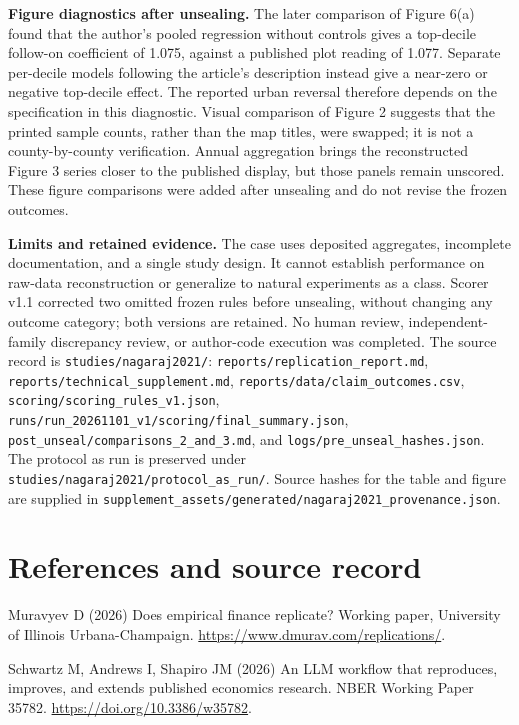 \documentclass[11pt]{article}
\newcommand{\artifact}[1]{\nolinkurl{#1}}
\begin{document}
\textbf{Figure diagnostics after unsealing.} The later comparison of Figure 6(a) found that the author's pooled regression without controls gives a top-decile follow-on coefficient of 1.075, against a published plot reading of 1.077. Separate per-decile models following the article's description instead give a near-zero or negative top-decile effect. The reported urban reversal therefore depends on the specification in this diagnostic. Visual comparison of Figure 2 suggests that the printed sample counts, rather than the map titles, were swapped; it is not a county-by-county verification. Annual aggregation brings the reconstructed Figure 3 series closer to the published display, but those panels remain unscored. These figure comparisons were added after unsealing and do not revise the frozen outcomes.

\textbf{Limits and retained evidence.} The case uses deposited aggregates, incomplete documentation, and a single study design. It cannot establish performance on raw-data reconstruction or generalize to natural experiments as a class. Scorer v1.1 corrected two omitted frozen rules before unsealing, without changing any outcome category; both versions are retained. No human review, independent-family discrepancy review, or author-code execution was completed. The source record is \artifact{studies/nagaraj2021/}: \artifact{reports/replication_report.md}, \artifact{reports/technical_supplement.md}, \artifact{reports/data/claim_outcomes.csv}, \artifact{scoring/scoring_rules_v1.json}, \artifact{runs/run_20261101_v1/scoring/final_summary.json}, \artifact{post_unseal/comparisons_2_and_3.md}, and \artifact{logs/pre_unseal_hashes.json}. The protocol as run is preserved under \artifact{studies/nagaraj2021/protocol_as_run/}. Source hashes for the table and figure are supplied in \artifact{supplement_assets/generated/nagaraj2021_provenance.json}.

\clearpage
\section{References and source record}
\begingroup\small\setlength{\parskip}{6pt}


Muravyev D (2026) Does empirical finance replicate? Working paper, University of Illinois Urbana-Champaign. \url{https://www.dmurav.com/replications/}.

Schwartz M, Andrews I, Shapiro JM (2026) An LLM workflow that reproduces, improves, and extends published economics research. NBER Working Paper 35782. \url{https://doi.org/10.3386/w35782}.
\endgroup
\end{document}
